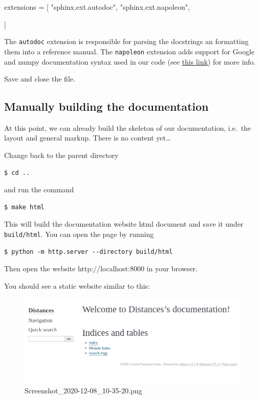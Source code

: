 \documentclass[11pt]{article}
\newenvironment{Shaded}{}{}
\newcommand{\StringTok}[1]{\textcolor[rgb]{0.25,0.44,0.63}{{#1}}}
\newcommand{\NormalTok}[1]{{#1}}
\newcommand{\OperatorTok}[1]{\textcolor[rgb]{0.40,0.40,0.40}{{#1}}}
\begin{document}
\begin{Shaded}
\begin{Highlighting}[]
\NormalTok{extensions }\OperatorTok{=}\NormalTok{ [}
        \StringTok{"sphinx.ext.autodoc"}\NormalTok{,}
        \StringTok{"sphinx.ext.napoleon"}\NormalTok{,}
        
\NormalTok{]}
\end{Highlighting}
\end{Shaded}

The \texttt{autodoc} extension is responsible for parsing the docstrings
an formatting them into a reference manual. The \texttt{napoleon}
extension adds support for Google and numpy documentation syntax used in
our code (see
\href{https://www.sphinx-doc.org/en/master/usage/extensions/napoleon.html\#module-sphinx.ext.napoleon}{this
link}) for more info.

Save and close the file.

\hypertarget{manually-building-the-documentation}{%
\subsection{Manually building the
documentation}\label{manually-building-the-documentation}}

At this point, we can already build the skeleton of our documentation,
i.e.~the layout and general markup. There is no content yet\ldots{}

Change back to the parent directory

\begin{verbatim}
$ cd ..
\end{verbatim}

and run the command

\begin{verbatim}
$ make html
\end{verbatim}

This will build the documentation website html document and save it
under \texttt{build/html}. You can open the page by running

\begin{verbatim}
$ python -m http.server --directory build/html
\end{verbatim}

Then open the website http://localhost:8000 in your browser.

You should see a static website similar to this:

\begin{figure}
\centering
\includegraphics{static/docs_header.png}
\caption{Screenshot\_2020-12-08\_10-35-20.png}
\end{figure}
\end{document}
